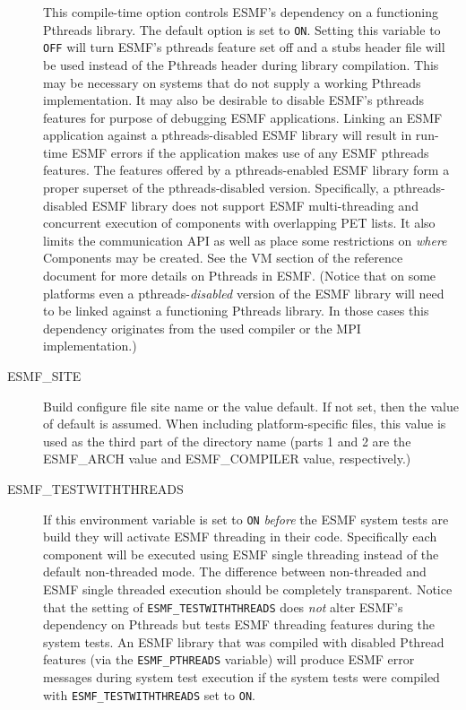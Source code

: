 \begin{description}
This compile-time option controls ESMF's dependency on a functioning
Pthreads library. The default option is set to {\tt ON}. Setting this
variable to {\tt OFF} will turn ESMF's pthreads feature set off and a
stubs header file will be used instead of the Pthreads header during
library compilation. This may be necessary on systems that do not
supply a working Pthreads implementation. It may also be desirable to
disable ESMF's pthreads features for purpose of debugging ESMF
applications. Linking an ESMF application against a pthreads-disabled
ESMF library will result in run-time ESMF errors if the application
makes use of any ESMF pthreads features. The features offered by a
pthreads-enabled ESMF library form a proper superset of the
pthreads-disabled version. Specifically, a pthreads-disabled ESMF
library does not support ESMF multi-threading and concurrent execution
of components with overlapping PET lists. It also limits the
communication API as well as place some restrictions on {\em where}
Components may be created. See the VM section of the reference
document for more details on Pthreads in ESMF. (Notice that on some
platforms even a pthreads-{\em disabled} version of the ESMF library
will need to be linked against a functioning Pthreads library. In
those cases this dependency originates from the used compiler or the
MPI implementation.)

\item[ESMF\_SITE] 
Build configure file site name or the value default.  
If not set, then the value of default is assumed.
When including platform-specific files, this value is used as the
third part of the directory name (parts 1 and 2 are the
ESMF\_ARCH value and ESMF\_COMPILER value, respectively.)

\item[ESMF\_TESTWITHTHREADS]

If this environment variable is set to {\tt ON} {\em before} the ESMF system tests are build they will activate ESMF threading in their code. Specifically each component will be executed using ESMF single threading instead of the default non-threaded mode. The difference between non-threaded and ESMF single threaded execution should be completely transparent. Notice that the setting of {\tt ESMF\_TESTWITHTHREADS} does {\em not} alter ESMF's dependency on Pthreads but tests ESMF threading features during the system tests. An ESMF library that was compiled with disabled Pthread features (via the {\tt ESMF\_PTHREADS} variable) will produce ESMF error messages during system test execution if the system tests were compiled with {\tt ESMF\_TESTWITHTHREADS} set to {\tt ON}.

\end{description}


